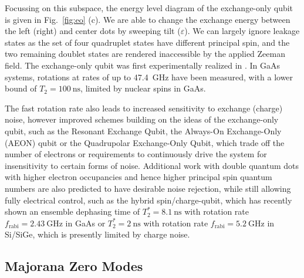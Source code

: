 Focussing on this subspace, the energy level diagram of the exchange-only qubit is given in Fig.~\ref{fig:eo} (c). We are able to change the exchange
energy between the left (right) and center dots by sweeping tilt ($\varepsilon$). We can largely ignore leakage states as the set of four quadruplet
states have different principal spin, and the two remaining doublet states are rendered inaccessible by the applied Zeeman field. The exchange-only
qubit was first experimentally realized in \cite{PhysRevB.82.075403}. In GaAs systems, rotations at rates of up to \SI{47.4}{\giga\hertz} have been measured,
with a lower bound of $T_2 = \SI{100}{\nano\second}$, limited by nuclear spins in GaAs\cite{nnano.2013.168}.

The fast rotation rate also leads to increased sensitivity to exchange (charge) noise, however improved schemes building
on the ideas of the exchange-only qubit\cite{Russ_2017}, such as the Resonant Exchange Qubit\cite{PhysRevLett.111.050501},
the Always-On Exchange-Only (AEON) qubit\cite{PhysRevB.93.121410} or the Quadrupolar Exchange-Only Qubit\cite{PhysRevLett.121.177701,Kornich_2018},
which trade off the number of electrons or requirements to continuously drive the system for insensitivity to certain forms of noise.
Additional work with double quantum dots with higher electron occupancies and hence higher principal spin quantum numbers are also
predicted to have desirable noise rejection, while still allowing fully electrical control, such as the hybrid
spin/charge-qubit\cite{PhysRevLett.108.140503}, which has recently shown an ensemble dephasing time
of $T_2^* = \SI{8.1}{\nano\second}$ with rotation rate $f_{\textrm{rabi}} = \SI{2.43}{\giga\hertz}$ in
GaAs\cite{PhysRevLett.116.086801} or $T_2^* = \SI{2}{\nano\second}$ with rotation rate $f_{\textrm{rabi}} = \SI{5.2}{\giga\hertz}$ in
Si/SiGe\cite{nature13407}, which is presently limited by charge noise\cite{s41534-017-0034-2}.

\subsection{Majorana Zero Modes}
\label{sec:majo}

